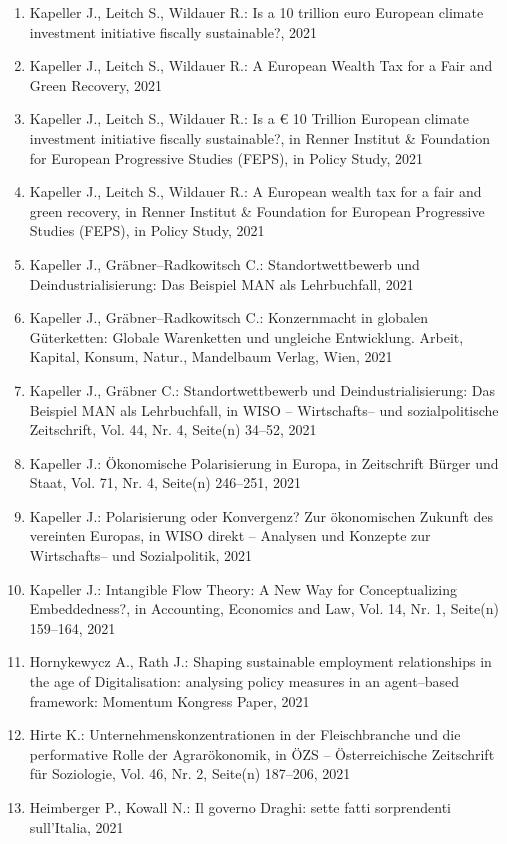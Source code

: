 \begin{enumerate}
	 \item Kapeller J., Leitch S., Wildauer R.: Is a 10 trillion euro European climate investment initiative fiscally sustainable?, 2021
	 \item Kapeller J., Leitch S., Wildauer R.: A European Wealth Tax for a Fair and Green Recovery, 2021
	 \item Kapeller J., Leitch S., Wildauer R.: Is a € 10 Trillion European climate investment initiative fiscally sustainable?, in Renner Institut \& Foundation for European Progressive Studies (FEPS), in Policy Study, 2021
	 \item Kapeller J., Leitch S., Wildauer R.: A European wealth tax for a fair and green recovery, in Renner Institut \& Foundation for European Progressive Studies (FEPS), in Policy Study, 2021
	 \item Kapeller J., Gräbner--Radkowitsch C.: Standortwettbewerb und Deindustrialisierung: Das Beispiel MAN als Lehrbuchfall, 2021
	 \item Kapeller J., Gräbner--Radkowitsch C.: Konzernmacht in globalen Güterketten: Globale Warenketten und ungleiche Entwicklung. Arbeit, Kapital, Konsum, Natur., Mandelbaum Verlag, Wien, 2021
	 \item Kapeller J., Gräbner C.: Standortwettbewerb und Deindustrialisierung: Das Beispiel MAN als Lehrbuchfall, in WISO -- Wirtschafts-- und sozialpolitische Zeitschrift, Vol. 44, Nr. 4, Seite(n) 34--52, 2021
	 \item Kapeller J.: Ökonomische Polarisierung in Europa, in Zeitschrift Bürger und Staat, Vol. 71, Nr. 4, Seite(n) 246--251, 2021
	 \item Kapeller J.: Polarisierung oder Konvergenz? Zur ökonomischen Zukunft des vereinten Europas, in WISO direkt -- Analysen und Konzepte zur Wirtschafts-- und Sozialpolitik, 2021
	 \item Kapeller J.: Intangible Flow Theory: A New Way for Conceptualizing Embeddedness?, in Accounting, Economics and Law, Vol. 14, Nr. 1, Seite(n) 159--164, 2021
	 \item Hornykewycz A., Rath J.: Shaping sustainable employment relationships in the age of Digitalisation: analysing policy measures in an agent--based framework: Momentum Kongress Paper, 2021
	 \item Hirte K.: Unternehmenskonzentrationen in der Fleischbranche und die performative Rolle der Agrarökonomik, in ÖZS -- Österreichische Zeitschrift für Soziologie, Vol. 46, Nr. 2, Seite(n) 187--206, 2021
	 \item Heimberger P., Kowall N.: Il governo Draghi: sette fatti sorprendenti sull’Italia, 2021

\end{enumerate}
